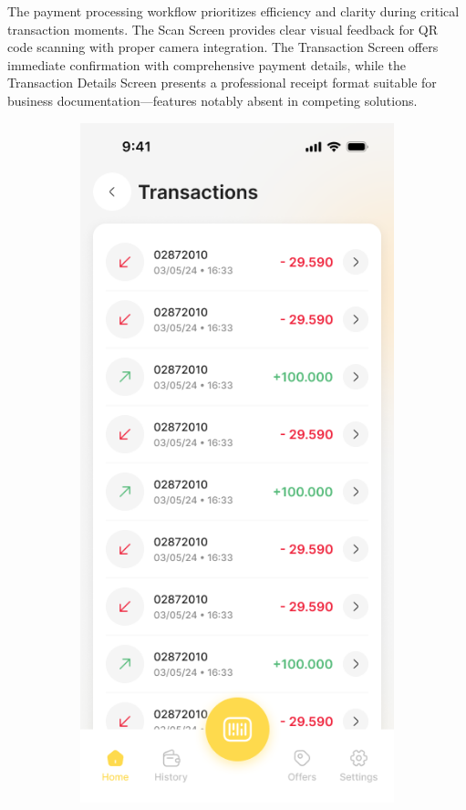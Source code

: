 The payment processing workflow prioritizes efficiency and clarity during critical transaction moments. The Scan Screen provides clear visual feedback for QR code scanning with proper camera integration. The Transaction Screen offers immediate confirmation with comprehensive payment details, while the Transaction Details Screen presents a professional receipt format suitable for business documentation—features notably absent in competing solutions.


\begin{figure}[H]
    \centering
    \begin{subfigure}[b]{0.32\textwidth}
        \centering
        \includegraphics[width=\textwidth]{images/transactions_list_screen.png}

\end{subfigure}
\end{figure}

